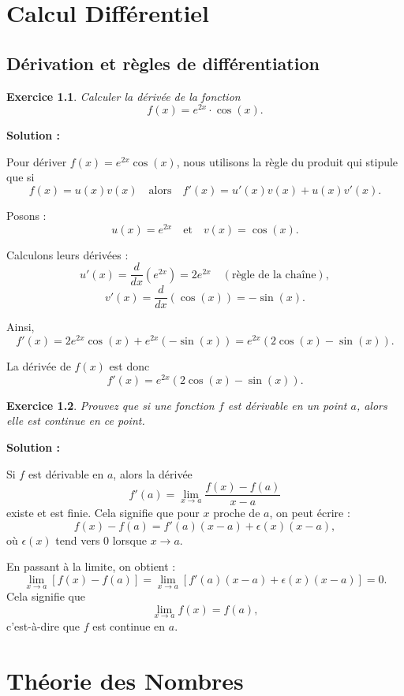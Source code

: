 \documentclass[11pt,twoside,openany]{book}
\newtheorem{exercice}{Exercice}[chapter]%
\newenvironment{solution}{\par\textbf{Solution :}\par\small}{\normalsize\par}
\begin{document}
\chapter{Calcul Différentiel}
\section{Dérivation et règles de différentiation}

\begin{exercice}
Calculer la dérivée de la fonction 
$$f(x) = e^{2x} \cdot \cos(x).$$
\end{exercice}

\begin{solution}
Pour dériver $f(x)=e^{2x}\cos(x)$, nous utilisons la règle du produit qui stipule que si
\[
f(x)=u(x)v(x) \quad \text{alors} \quad f'(x)=u'(x)v(x)+u(x)v'(x).
\]

\medskip %

Posons :
\[
u(x)=e^{2x} \quad \text{et} \quad v(x)=\cos(x).
\]

Calculons leurs dérivées :
\[
u'(x)=\frac{d}{dx}(e^{2x}) = 2e^{2x} \quad (\text{règle de la chaîne}),
\]
\[
v'(x)=\frac{d}{dx}(\cos(x)) = -\sin(x).
\]

Ainsi,
\[
f'(x)=2e^{2x}\cos(x) + e^{2x}(-\sin(x)) = e^{2x}\left(2\cos(x)-\sin(x)\right).
\]

La dérivée de $f(x)$ est donc 
\[
f'(x)=e^{2x}(2\cos(x)-\sin(x)).
\]
\end{solution}

\begin{exercice}
Prouvez que si une fonction $f$ est dérivable en un point $a$, alors elle est continue en ce point.
\end{exercice}

\begin{solution}
Si $f$ est dérivable en $a$, alors la dérivée
\[
f'(a)=\lim_{x \to a}\frac{f(x)-f(a)}{x-a}
\]
existe et est finie. Cela signifie que pour $x$ proche de $a$, on peut écrire :
\[
f(x)-f(a)=f'(a)(x-a)+\epsilon(x)(x-a),
\]
où $\epsilon(x)$ tend vers 0 lorsque $x \to a$. 

En passant à la limite, on obtient :
\[
\lim_{x \to a}\left[f(x)-f(a)\right]=\lim_{x \to a}\left[f'(a)(x-a)+\epsilon(x)(x-a)\right]=0.
\]
Cela signifie que
\[
\lim_{x \to a} f(x)=f(a),
\]
c'est-à-dire que $f$ est continue en $a$.
\end{solution}

\chapter{Théorie des Nombres}
\end{document}

